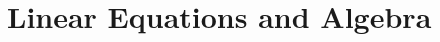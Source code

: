\documentclass[../satmath.tex]{subfiles}
\begin{document}
\chapter{Linear Equations and Algebra}
\end{document}
